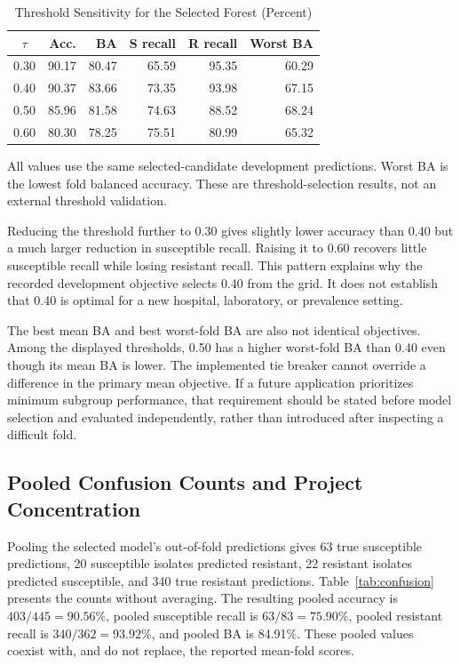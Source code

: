 \documentclass[conference]{IEEEtran}
\begin{document}
\begin{table}[t]
\caption{Threshold Sensitivity for the Selected Forest (Percent)}
\label{tab:threshold}
\centering\footnotesize
\begin{tabular}{crrrrr}\toprule
$\tau$ & Acc. & BA & S recall & R recall & Worst BA\\\midrule
0.30&90.17&80.47&65.59&95.35&60.29\\
0.40&90.37&83.66&73.35&93.98&67.15\\
0.50&85.96&81.58&74.63&88.52&68.24\\
0.60&80.30&78.25&75.51&80.99&65.32\\\bottomrule
\end{tabular}
\vspace{3pt}
\parbox{\columnwidth}{\footnotesize All values use the same selected-candidate development predictions. Worst BA is the lowest fold balanced accuracy. These are threshold-selection results, not an external threshold validation.}
\end{table}

Reducing the threshold further to 0.30 gives slightly lower accuracy than 0.40 but a much larger reduction in susceptible recall. Raising it to 0.60 recovers little susceptible recall while losing resistant recall. This pattern explains why the recorded development objective selects 0.40 from the grid. It does not establish that 0.40 is optimal for a new hospital, laboratory, or prevalence setting.

The best mean BA and best worst-fold BA are also not identical objectives. Among the displayed thresholds, 0.50 has a higher worst-fold BA than 0.40 even though its mean BA is lower. The implemented tie breaker cannot override a difference in the primary mean objective. If a future application prioritizes minimum subgroup performance, that requirement should be stated before model selection and evaluated independently, rather than introduced after inspecting a difficult fold.

\subsection{Pooled Confusion Counts and Project Concentration}
Pooling the selected model's out-of-fold predictions gives 63 true susceptible predictions, 20 susceptible isolates predicted resistant, 22 resistant isolates predicted susceptible, and 340 true resistant predictions. Table~\ref{tab:confusion} presents the counts without averaging. The resulting pooled accuracy is $403/445=90.56\%$, pooled susceptible recall is $63/83=75.90\%$, pooled resistant recall is $340/362=93.92\%$, and pooled BA is 84.91\%. These pooled values coexist with, and do not replace, the reported mean-fold scores.
\end{document}
